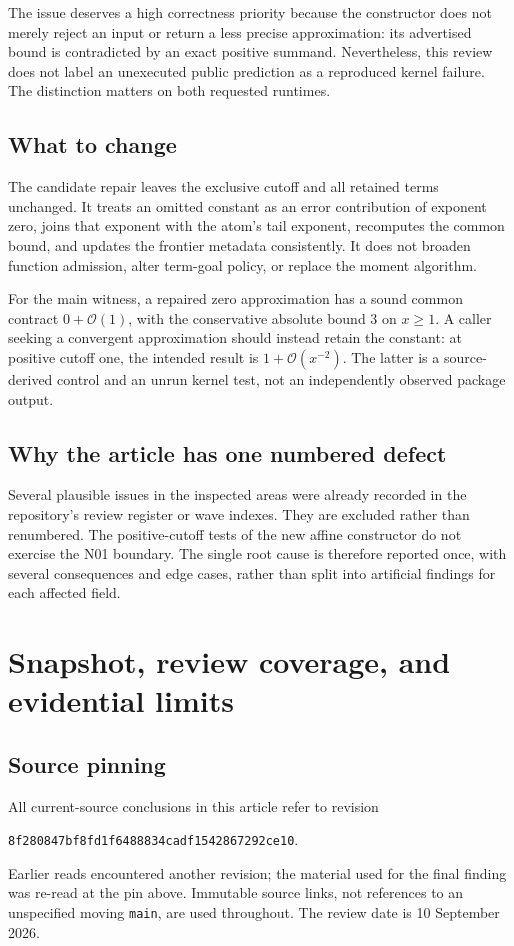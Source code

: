 \documentclass[11pt,letterpaper]{article}
\newcommand{\code}[1]{\nolinkurl{#1}}
\newcommand{\pin}{8f280847bf8fd1f6488834cadf1542867292ce10}
\newcommand{\OO}{\mathcal{O}}
\begin{document}
The issue deserves a high correctness priority because the constructor does
not merely reject an input or return a less precise approximation: its
advertised bound is contradicted by an exact positive summand. Nevertheless,
this review does not label an unexecuted public prediction as a reproduced
kernel failure. The distinction matters on both requested runtimes.

\subsection{What to change}
The candidate repair leaves the exclusive cutoff and all retained terms
unchanged. It treats an omitted constant as an error contribution of exponent
zero, joins that exponent with the atom's tail exponent, recomputes the common
bound, and updates the frontier metadata consistently. It does not broaden
function admission, alter term-goal policy, or replace the moment algorithm.

For the main witness, a repaired zero approximation has a sound common
contract $0+\OO(1)$, with the conservative absolute bound $3$ on $x\ge1$.
A caller seeking a convergent approximation should instead retain the constant:
at positive cutoff one, the intended result is $1+\OO(x^{-2})$. The latter is a
source-derived control and an unrun kernel test, not an independently observed
package output.

\subsection{Why the article has one numbered defect}
Several plausible issues in the inspected areas were already recorded in the
repository's review register or wave indexes. They are excluded rather than
renumbered. The positive-cutoff tests of the new affine constructor do not
exercise the N01 boundary. The single root cause is therefore reported once,
with several consequences and edge cases, rather than split into artificial
findings for each affected field.\cite{index,register,wave5,wave6,boundarytests}

\section{Snapshot, review coverage, and evidential limits}
\subsection{Source pinning}
All current-source conclusions in this article refer to revision
\par\texttt{\pin}.\par
Earlier reads encountered another revision; the material used
for the final finding was re-read at the pin above. Immutable source links,
not references to an unspecified moving \code{main}, are used throughout.
The review date is 10 September 2026.
\end{document}
